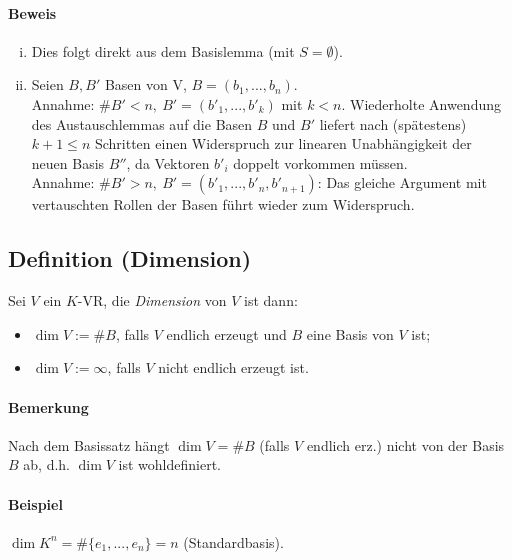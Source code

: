  	\paragraph{Beweis}
 		\begin{enumerate}[(i)]
 			\item  Dies folgt direkt aus dem Basislemma (mit $S=\emptyset$).
 			\item Seien $B,B'$ Basen von V, $B = (b_1,...,b_n)$.\\
 			      Annahme: $\#B' < n,\ B' = (b'_1,...,b'_k)$ mit $k < n$. Wiederholte Anwendung des Austauschlemmas auf die Basen $B$ und $B'$ liefert nach (spätestens) $k+1\leq n$ Schritten einen Widerspruch zur linearen Unabhängigkeit der neuen Basis $B''$, da Vektoren $b'_i$ doppelt vorkommen müssen.\\
 			      Annahme: $\#B' > n,\ B' = (b'_1,...,b'_n,b'_{n+1})$: Das gleiche Argument mit vertauschten Rollen der Basen führt wieder zum Widerspruch.
 		\end{enumerate}

 \subsection{Definition (Dimension)}
 	\begin{Definition}[Dimension]
 		Sei $V$ ein $K$-VR, die \emph{Dimension} von $ V $ ist dann:
 		\begin{itemize}
 			\item $\dim V:= \#B$, falls $ V $ endlich erzeugt und $B$ eine Basis von $V$ ist;
 			\item $\dim V:= \infty$, falls $V$ nicht endlich erzeugt ist.
 		\end{itemize}
 	\end{Definition}

 	\paragraph{Bemerkung}
 		Nach dem Basissatz hängt $\dim V = \#B$ (falls $V$ endlich erz.) nicht von der Basis $B$ ab, d.h. $\dim V$ ist wohldefiniert.

 	\paragraph{Beispiel}
 		$\dim K^n = \#\{e_1,...,e_n\} = n$ (Standardbasis).


